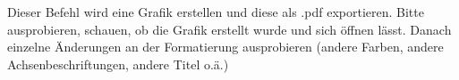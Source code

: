 \documentclass[]{book}
\begin{document}
Dieser Befehl wird eine Grafik erstellen und diese als .pdf exportieren.
Bitte ausprobieren, schauen, ob die Grafik erstellt wurde und sich
öffnen lässt. Danach einzelne Änderungen an der Formatierung
ausprobieren (andere Farben, andere Achsenbeschriftungen, andere Titel
o.ä.)


\end{document}

